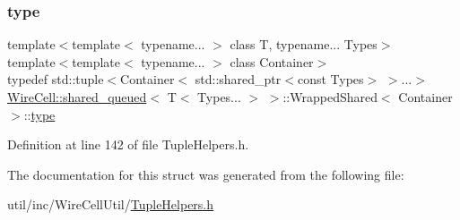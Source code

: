 \subsubsection{\texorpdfstring{type}{type}}
{\footnotesize\ttfamily template$<$template$<$ typename... $>$ class T, typename... Types$>$ \\
template$<$template$<$ typename... $>$ class Container$>$ \\
typedef std\+::tuple$<$Container$<$ std\+::shared\+\_\+ptr$<$const Types$>$ $>$...$>$ \hyperlink{struct_wire_cell_1_1shared__queued}{Wire\+Cell\+::shared\+\_\+queued}$<$ T$<$ Types... $>$ $>$\+::Wrapped\+Shared$<$ Container $>$\+::\hyperlink{struct_wire_cell_1_1shared__queued_3_01_t_3_01_types_8_8_8_01_4_01_4_1_1_wrapped_shared_a8ab769b52ad67b7d50cf1e72ad83651a}{type}}



Definition at line 142 of file Tuple\+Helpers.\+h.



The documentation for this struct was generated from the following file\+:\begin{DoxyCompactItemize}
\item 
util/inc/\+Wire\+Cell\+Util/\hyperlink{_tuple_helpers_8h}{Tuple\+Helpers.\+h}\end{DoxyCompactItemize}
